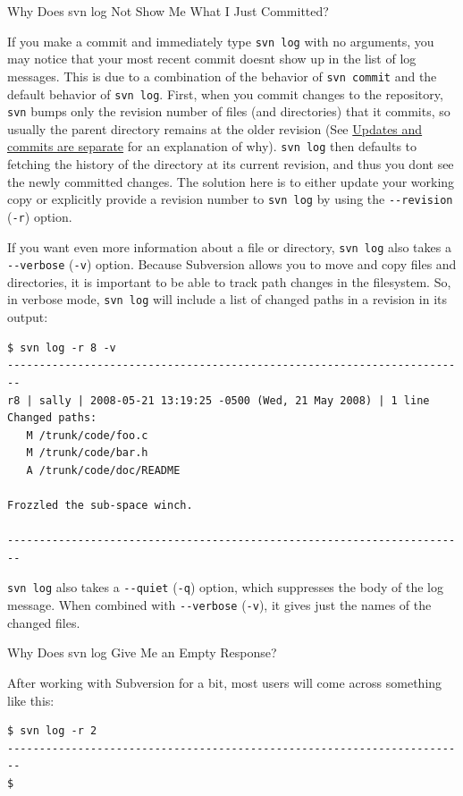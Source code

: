 Why Does svn log Not Show Me What I Just Committed?

If you make a commit and immediately type \texttt{svn\ log} with no
arguments, you may notice that your most recent commit
doesn\textquotesingle t show up in the list of log messages. This is due
to a combination of the behavior of \texttt{svn\ commit} and the default
behavior of \texttt{svn\ log}. First, when you commit changes to the
repository, \texttt{svn} bumps only the revision number of files (and
directories) that it commits, so usually the parent directory remains at
the older revision (See
\hyperref[svn.basic.in-action.mixedrevs.update-commit]{Updates and
commits are separate} for an explanation of why). \texttt{svn\ log} then
defaults to fetching the history of the directory at its current
revision, and thus you don\textquotesingle t see the newly committed
changes. The solution here is to either update your working copy or
explicitly provide a revision number to \texttt{svn\ log} by using the
\texttt{-\/-revision} (\texttt{-r}) option.

If you want even more information about a file or directory,
\texttt{svn\ log} also takes a \texttt{-\/-verbose} (\texttt{-v})
option. Because Subversion allows you to move and copy files and
directories, it is important to be able to track path changes in the
filesystem. So, in verbose mode, \texttt{svn\ log} will include a list
of changed paths in a revision in its output:

\begin{verbatim}
$ svn log -r 8 -v
------------------------------------------------------------------------
r8 | sally | 2008-05-21 13:19:25 -0500 (Wed, 21 May 2008) | 1 line
Changed paths:
   M /trunk/code/foo.c
   M /trunk/code/bar.h
   A /trunk/code/doc/README

Frozzled the sub-space winch.

------------------------------------------------------------------------
\end{verbatim}

\texttt{svn\ log} also takes a \texttt{-\/-quiet} (\texttt{-q}) option,
which suppresses the body of the log message. When combined with
\texttt{-\/-verbose} (\texttt{-v}), it gives just the names of the
changed files.

Why Does svn log Give Me an Empty Response?

After working with Subversion for a bit, most users will come across
something like this:

\begin{verbatim}
$ svn log -r 2
------------------------------------------------------------------------
$
\end{verbatim}

